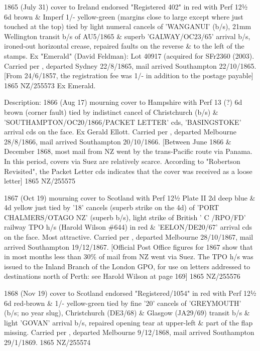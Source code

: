 \documentclass[justified]{tufte-book}
\begin{document}
%
{1865 (July 31) cover to Ireland endorsed "Registered 402" in red with Perf 12½ 6d brown \& Imperf 1/- yellow-green (margins close to large except where just touched at the top) tied by light numeral cancels of 'WANGANUI' (b/s), 21mm Wellington transit b/s of AU5/1865 \& superb 'GALWAY/OC23/65' arrival b/s, ironed-out horizontal crease, repaired faults on the reverse \& to the left of the stamps. Ex "Emerald" (David Feldman): Lot 40917 (acquired for SFr2360 (2003). Carried per , departed Sydney 22/8/1865, mail arrived Southampton 22/10/1865. [From 24/6/1857, the registration fee was 1/- in addition to the postage payable]}%
{1865}%
{NZ/255573}%
{Ex Emerald.}%
{}
{}%
{}%

%
{Description: 1866 (Aug 17) mourning cover to Hampshire with Perf 13 (?) 6d brown (corner fault) tied by indistinct cancel of Christchurch (b/s) \& 'SOUTHAMPTON/OC20/1866/PACKET LETTER' cds, 'BASINGSTOKE' arrival cds on the face. Ex Gerald Ellott. Carried per , departed Melbourne 28/8/1866, mail arrived Southampton 20/10/1866. [Between June 1866 \& December 1868, most mail from NZ went by the trans-Pacific route via Panama. In this period, covers via Suez are relatively scarce. According to "Robertson Revisited", the Packet Letter cds indicates that the cover was received as a loose letter]}%
{1865}%
{NZ/255575}%
{}%
{}
{}%
{}%

%
{1867 (Oct 19) mourning cover to Scotland with Perf 12½ Plate II 2d deep blue \& 4d yellow just tied by '18' cancels (superb strike on the 4d) of 'PORT CHALMERS/OTAGO NZ' (superb b/s), light strike of British ' C /RPO/FD' railway TPO h/s (Harold Wilson \#644) in red \& 'EELON/DE20/67' arrival cds on the face. Most attractive. Carried per , departed Melbourne 28/10/1867, mail arrived Southampton 19/12/1867. [Official Post Office figures for 1867 show that in most months less than 30\% of mail from NZ went via Suez. The TPO h/s was issued to the Inland Branch of the London GPO, for use on letters addressed to destinations north of Perth: see Harold Wilson at page 169]}%
{1865}%
{NZ/255576}%
{}%
{}
{}%
{}%

%
{1868 (Nov 19) cover to Scotland endorsed "Registered/1054" in red with Perf 12½ 6d red-brown \& 1/- yellow-green tied by fine '20' cancels of 'GREYMOUTH' (b/s; no year slug), Christchurch (DE3/68) \& Glasgow (JA29/69) transit b/s \& light 'GOVAN' arrival b/s, repaired opening tear at upper-left \& part of the flap missing. Carried per , departed Melbourne 9/12/1868, mail arrived Southampton 29/1/1869.}%
{1865}%
{NZ/255574}%
{}%
{}
{}%
{}%
\end{document}
